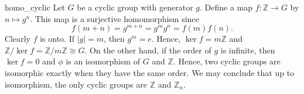  
\begin{example}{homo_cyclic}
Let $G$ be a cyclic group with generator $g$. Define a map $f :
{\mathbb Z} \rightarrow G$ by $n \mapsto g^n$.  This map is a surjective
homomorphism since  
\[
f( m + n) = g^{m+n} = g^m g^n = f(m) f(n).
\]
Clearly $f$ is onto. If $|g| = m$, then  $g^m = e$. Hence, $\ker
f = m {\mathbb Z}$ and ${\mathbb Z} / \ker f =  {\mathbb Z} / m {\mathbb Z}
\cong G$. On the other hand, if the order of $g$ is infinite, then
$\ker f = 0$ and $\phi$ is an isomorphism of $G$ and ${\mathbb Z}$.
Hence, two cyclic groups are isomorphic exactly when they have the
same order. We may conclude that up to isomorphism, the only cyclic groups are ${\mathbb Z}$
and ${\mathbb Z}_n$. 
\end{example}
 


